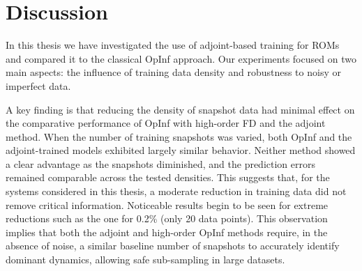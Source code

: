 
\chapter{Discussion}
\label{chap:discussion}
\vspace{-1.3cm}

In this thesis we have investigated the use of adjoint-based training for ROMs and compared it to the classical OpInf approach. Our experiments focused on two main aspects: the influence of training data density and robustness to noisy or imperfect data.

A key finding is that reducing the density of snapshot data had minimal effect on the comparative performance of OpInf with high-order FD and the adjoint method. When the number of training snapshots was varied, both OpInf and the adjoint-trained models exhibited largely similar behavior. Neither method showed a clear advantage as the snapshots diminished, and the prediction errors remained comparable across the tested densities. This suggests that, for the systems considered in this thesis, a moderate reduction in training data did not remove critical information. Noticeable results begin to be seen for extreme reductions such as the one for 0.2\% (only 20 data points). This observation implies that both the adjoint and high-order OpInf methods require, in the absence of noise, a similar baseline number of snapshots to accurately identify dominant dynamics, allowing safe sub-sampling in large datasets.



